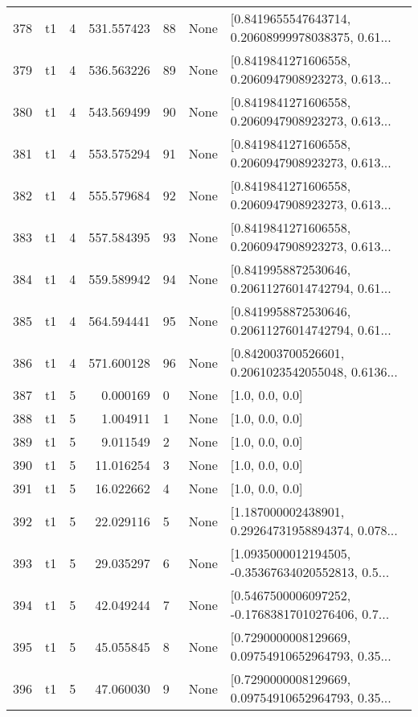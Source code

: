 \begin{tabular}{lllrlll}
378 &  t1 &   4 &  531.557423 &   88 &  None &  [0.8419655547643714, 0.20608999978038375, 0.61... \\
379 &  t1 &   4 &  536.563226 &   89 &  None &  [0.8419841271606558, 0.2060947908923273, 0.613... \\
380 &  t1 &   4 &  543.569499 &   90 &  None &  [0.8419841271606558, 0.2060947908923273, 0.613... \\
381 &  t1 &   4 &  553.575294 &   91 &  None &  [0.8419841271606558, 0.2060947908923273, 0.613... \\
382 &  t1 &   4 &  555.579684 &   92 &  None &  [0.8419841271606558, 0.2060947908923273, 0.613... \\
383 &  t1 &   4 &  557.584395 &   93 &  None &  [0.8419841271606558, 0.2060947908923273, 0.613... \\
384 &  t1 &   4 &  559.589942 &   94 &  None &  [0.8419958872530646, 0.20611276014742794, 0.61... \\
385 &  t1 &   4 &  564.594441 &   95 &  None &  [0.8419958872530646, 0.20611276014742794, 0.61... \\
386 &  t1 &   4 &  571.600128 &   96 &  None &  [0.842003700526601, 0.2061023542055048, 0.6136... \\
387 &  t1 &   5 &    0.000169 &    0 &  None &                                    [1.0, 0.0, 0.0] \\
388 &  t1 &   5 &    1.004911 &    1 &  None &                                    [1.0, 0.0, 0.0] \\
389 &  t1 &   5 &    9.011549 &    2 &  None &                                    [1.0, 0.0, 0.0] \\
390 &  t1 &   5 &   11.016254 &    3 &  None &                                    [1.0, 0.0, 0.0] \\
391 &  t1 &   5 &   16.022662 &    4 &  None &                                    [1.0, 0.0, 0.0] \\
392 &  t1 &   5 &   22.029116 &    5 &  None &  [1.187000002438901, 0.29264731958894374, 0.078... \\
393 &  t1 &   5 &   29.035297 &    6 &  None &  [1.0935000012194505, -0.35367634020552813, 0.5... \\
394 &  t1 &   5 &   42.049244 &    7 &  None &  [0.5467500006097252, -0.17683817010276406, 0.7... \\
395 &  t1 &   5 &   45.055845 &    8 &  None &  [0.7290000008129669, 0.09754910652964793, 0.35... \\
396 &  t1 &   5 &   47.060030 &    9 &  None &  [0.7290000008129669, 0.09754910652964793, 0.35... \\

\end{tabular}
